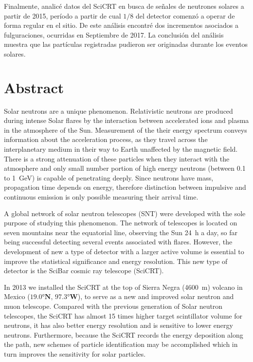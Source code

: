 Finalmente, analicé datos del SciCRT en busca de señales de neutrones solares a partir de \num{2015}, período a partir de cual $1/8$ del detector comenzó a operar de forma regular en el sitio. De este análisis encontré dos incrementos asociados a fulguraciones, ocurridas en Septiembre de \num{2017}. La conclusión del análisis muestra que las partículas registradas pudieron ser originadas durante los eventos solares.

\chapter{Abstract}

Solar neutrons are a unique phenomenon. Relativistic neutrons are produced during intense Solar flares by the interaction between accelerated ions and plasma in the atmosphere of the Sun. Measurement of the their energy spectrum conveys information about the acceleration process, as they travel across the interplanetary medium in their way to Earth unaffected by the magnetic field. There is a strong attenuation of these particles when they interact with the atmosphere and only small number portion of high energy neutrons (between \num{0.1} to \SI{1}{\giga\electronvolt}) is capable of penetrating deeply. Since neutrons have mass, propagation time depends on energy, therefore distinction between impulsive and continuous emission is only possible measuring their arrival time.

A global network of solar neutron telescopes (SNT) were developed with the sole purpose of studying this phenomenon. The network of telescopes is located on seven mountains near the equatorial line, observing the Sun \SI{24}{\hour} a day, so far being successful detecting several events associated with flares. However, the development of new a type of detector with a larger active volume is essential to improve the statistical significance and energy resolution. This new type of detector is the SciBar cosmic ray telescope  (SciCRT).

In \num{2013} we installed the SciCRT at the top of Sierra Negra (\SI{4600}{\metre}) volcano in Mexico ($\ang{19.0}\mathbf{N}$, $\ang{97.3}\mathbf{W}$), to serve as a new and improved solar neutron and muon telescope. Compared with the previous generation of Solar neutron telescopes, the SciCRT has almost \num{15} times higher target scintillator volume for neutrons, it has also better energy resolution and is sensitive to lower energy neutrons. Furthermore, because the SciCRT records the energy deposition along the path, new schemes of particle identification may be accomplished which in turn improves the sensitivity for solar particles.

